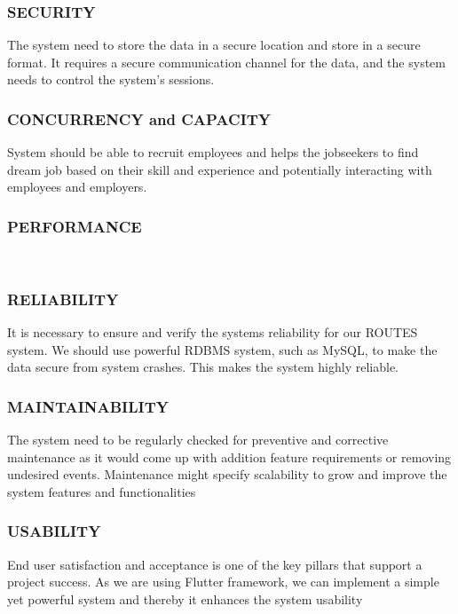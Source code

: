 \documentclass[12pt,a4paper,final]{extreport}
\begin{document}
\subsubsection{SECURITY }
\hspace{01.5cm}The system need to store the data in a secure location and store in a secure format. It requires a secure communication channel for the data, and the system needs to control the system’s sessions.\\
\subsubsection{CONCURRENCY and CAPACITY  }
\hspace{01.5cm}System should be able to recruit employees and helps the jobseekers to find dream job based on their skill and experience and potentially interacting with employees and employers.\\
\subsubsection{ PERFORMANCE}
\hspace{01.5cmThe performance of recruiting process of the system is depending on the accuracy in skill and experience of the jobseekers. We are using K-means algorithm which reaps an accuracy of 78.33 percentage}\\
\subsubsection{ RELIABILITY}
\hspace{01.5cm}It is necessary to ensure and verify the systems reliability for our ROUTES system. We should use powerful RDBMS system, such as MySQL, to make the data secure from system crashes. This makes the system highly reliable.\\
\subsubsection{MAINTAINABILITY}
\hspace{01.5cm}The system need to be regularly checked for preventive and corrective maintenance as it would come up with addition feature requirements or removing undesired events. Maintenance might specify scalability to grow and improve the system features and functionalities\\
\subsubsection{ USABILITY}
\hspace{01.5cm}End user satisfaction and acceptance is one of the key pillars that support a project success. As we are using Flutter framework, we can implement a simple yet powerful system and thereby it enhances the system usability\\
\end{document}
